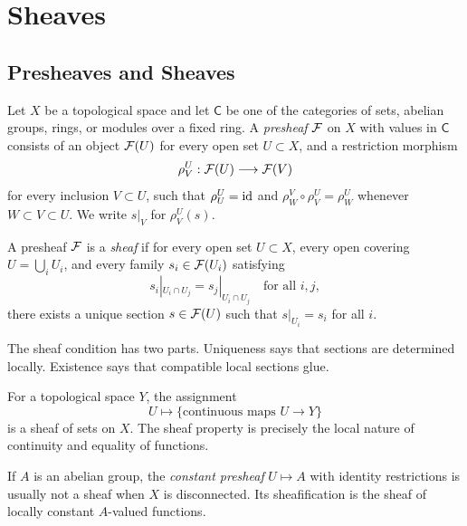 \chapter{Sheaves}

\section{Presheaves and Sheaves}

\begin{definition}
Let \(X\) be a topological space and let \(\mathsf{C}\) be one of the
categories of sets, abelian groups, rings, or modules over a fixed ring.  A
\emph{presheaf} \(\mathcal{F}\) on \(X\) with values in \(\mathsf{C}\) consists of an
object \(\mathcal{F}(U)\) for every open set \(U\subset X\), and a restriction morphism
\[
    \rho^U_V:\mathcal{F}(U)\longrightarrow \mathcal{F}(V)
\]
for every inclusion \(V\subset U\), such that \(\rho^U_U=\operatorname{id}\) and
\(\rho^V_W\circ \rho^U_V=\rho^U_W\) whenever \(W\subset V\subset U\).  We write
\(s|_V\) for \(\rho^U_V(s)\).
\end{definition}

\begin{definition}
A presheaf \(\mathcal{F}\) is a \emph{sheaf} if for every open set \(U\subset X\), every
open covering \(U=\bigcup_i U_i\), and every family \(s_i\in \mathcal{F}(U_i)\)
satisfying
\[
    s_i|_{U_i\cap U_j}=s_j|_{U_i\cap U_j}
    \quad\text{for all }i,j,
\]
there exists a unique section \(s\in \mathcal{F}(U)\) such that \(s|_{U_i}=s_i\) for
all \(i\).
\end{definition}

\begin{remark}
The sheaf condition has two parts.  Uniqueness says that sections are determined
locally.  Existence says that compatible local sections glue.
\end{remark}

\begin{example}
For a topological space \(Y\), the assignment
\[
    U\longmapsto \{ \text{continuous maps } U\to Y\}
\]
is a sheaf of sets on \(X\).  The sheaf property is precisely the local nature
of continuity and equality of functions.
\end{example}

\begin{example}
If \(A\) is an abelian group, the \emph{constant presheaf}
\(U\mapsto A\) with identity restrictions is usually not a sheaf when \(X\) is
disconnected.  Its sheafification is the sheaf of locally constant
\(A\)-valued functions.
\end{example}

